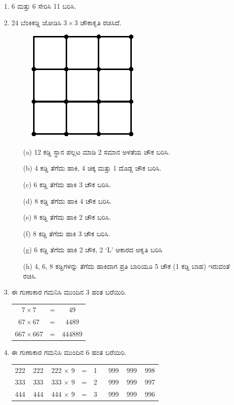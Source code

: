 \begin{enumerate}
\item 6 ಮತ್ತು 6 ಸೇರಿಸಿ 11 ಬರಿಸಿ. 

\item 24 ಬೆಂಕಿಕಡ್ಡಿ ಜೋಡಿಸಿ $3\times 3$ ಚೌಕಾಕೃತಿ ರಚಿಸಿದೆ. 
\begin{figure}[H]
\centering
\includegraphics[scale=1.3]{images/chap8/q13.eps}
\end{figure}

\begin{itemize}
\item[(a)] 12 ಕಡ್ಡಿ ಸ್ಥಾನ ಪಲ್ಲಟ ಮಾಡಿ 2 ಸಮಾನ ಅಳತೆಯ ಚೌಕ ಬರಿಸಿ.
\item[(b)] 4 ಕಡ್ಡಿ ತೆಗೆದು ಹಾಕಿ, 4 ಚಿಕ್ಕ ಮತ್ತು 1 ದೊಡ್ಡ ಚೌಕ ಬರಿಸಿ.
\item[(c)] 6 ಕಡ್ಡಿ ತೆಗೆದು ಹಾಕಿ 3 ಚೌಕ ಬರಿಸಿ.
\item[(d)] 8 ಕಡ್ಡಿ ತೆಗೆದು ಹಾಕಿ 4 ಚೌಕ ಬರಿಸಿ.
\item[(e)] 8 ಕಡ್ಡಿ ತೆಗೆದು ಹಾಕಿ 2 ಚೌಕ ಬರಿಸಿ.
\item[(f)] 8 ಕಡ್ಡಿ ತೆಗೆದು ಹಾಕಿ 3 ಚೌಕ ಬರಿಸಿ.
\item[(g)] 6 ಕಡ್ಡಿ ತೆಗೆದು ಹಾಕಿ 2 ಚೌಕ, 2 `L' ಆಕಾರದ ಆಕೃತಿ ಬರಿಸಿ 
\item[(h)] 4, 6, 8 ಕಡ್ಡಿಗಳನ್ನು ತೆಗೆದು ಹಾಕಿದಾಗ ಪ್ರತಿ ಬಾರಿಯೂ 5 ಚೌಕ (1 ಕಡ್ಡಿ ಬಾಹ) ಇರುವಂತೆ ರಚಿಸಿ. 
\end{itemize}

\item ಈ ಗುಣಾಕಾರ ಗಮನಿಸಿ ಮುಂದಿನ 3 ಹಂತ ಬರೆಯಿರಿ.

\begin{tabular}[t]{ccc}
$7\times 7$ & = & $49$\\
$67\times 67$ & = & $4489$\\
$667\times 667$ & = & $444889$
\end{tabular}

\eject

\item ಈ ಗುಣಾಕಾರ ಗಮನಿಸಿ ಮುಂದಿನ 6 ಹಂತ ಬರೆಯಿರಿ. 

\begin{tabular}[t]{ccc}
222 ~ 222 ~ 222 $\times$ 9 & = & 1 ~~ 999 ~ 999 ~ 998\\
333 ~ 333 ~ 333 $\times$ 9 & = & 2 ~~ 999 ~ 999 ~ 997\\
444 ~ 444 ~ 444 $\times$ 9 & = & 3 ~~ 999 ~ 999 ~ 996
\end{tabular}


\end{enumerate}
